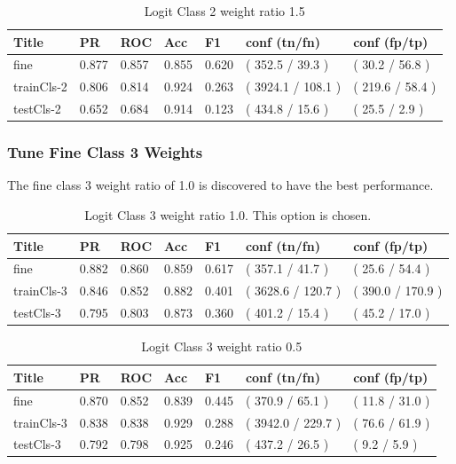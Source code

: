 \documentclass[ms]{nuthesis}
\begin{document}
\FloatBarrier
\begin{table}[H]
\centering
\caption{Logit Class 2 weight ratio 1.5}
\label{tab:LogRegCls2-Wt1p5}
\begin{tabular}{|l||l||l||l||l||l||l|}\toprule
Title & PR & ROC & Acc & F1 & conf (tn/fn) & conf (fp/tp) \\ \midrule
fine & 0.877 & 0.857 & 0.855 & 0.620 & ( 352.5 / 39.3 ) & ( 30.2 / 56.8 ) \\
trainCls-2 & 0.806 & 0.814 & 0.924 & 0.263 & ( 3924.1 / 108.1 ) & ( 219.6 / 58.4 ) \\
testCls-2 & 0.652 & 0.684 & 0.914 & 0.123 & ( 434.8 / 15.6 ) & ( 25.5 / 2.9 ) \\ \bottomrule
\end{tabular}
\end{table}
\FloatBarrier


\subsubsection{Tune Fine Class 3 Weights}
\par The fine class 3 weight ratio of 1.0 is discovered to have the best performance.
\FloatBarrier
\begin{table}[H]
\centering
\caption{Logit Class 3 weight ratio 1.0. This option is chosen.}
\label{tab:LogRegCls3-Wt1}
\begin{tabular}{|l||l||l||l||l||l||l|}\toprule
Title & PR & ROC & Acc & F1 & conf (tn/fn) & conf (fp/tp) \\ \midrule
fine & 0.882 & 0.860 & 0.859 & 0.617 & ( 357.1 / 41.7 ) & ( 25.6 / 54.4 ) \\
trainCls-3 & 0.846 & 0.852 & 0.882 & 0.401 & ( 3628.6 / 120.7 ) & ( 390.0 / 170.9 ) \\
testCls-3 & 0.795 & 0.803 & 0.873 & 0.360 & ( 401.2 / 15.4 ) & ( 45.2 / 17.0 ) \\ \bottomrule
\end{tabular}
\end{table}
\FloatBarrier


\FloatBarrier
\begin{table}[H]
\centering
\caption{Logit Class 3 weight ratio 0.5}
\label{tab:LogRegCls3-Wtp5}
\begin{tabular}{|l||l||l||l||l||l||l|}\toprule
Title & PR & ROC & Acc & F1 & conf (tn/fn) & conf (fp/tp) \\ \midrule
fine & 0.870 & 0.852 & 0.839 & 0.445 & ( 370.9 / 65.1 ) & ( 11.8 / 31.0 ) \\
trainCls-3 & 0.838 & 0.838 & 0.929 & 0.288 & ( 3942.0 / 229.7 ) & ( 76.6 / 61.9 ) \\
testCls-3 & 0.792 & 0.798 & 0.925 & 0.246 & ( 437.2 / 26.5 ) & ( 9.2 / 5.9 ) \\ \bottomrule
\end{tabular}
\end{table}
\FloatBarrier
\end{document}
